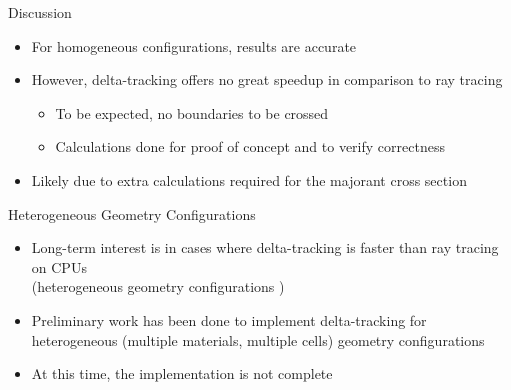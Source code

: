 \documentclass[xcolor=x11names, compress]{beamer}
\renewcommand{\(}{\begin{columns}}
\renewcommand{\)}{\end{columns}}
\newcommand{\<}[1]{\begin{column}{#1}}
\renewcommand{\>}{\end{column}}
\begin{document}
\begin{frame}{Discussion}
	\begin{itemize}
	\item{For homogeneous configurations, results are accurate}
	\pause
	\vspace*{1 em}
	\item{However, delta-tracking offers no great speedup in comparison to ray tracing}
		\begin{itemize}
		\pause
		\item{To be expected, no boundaries to be crossed}
		\item{Calculations done for proof of concept and to verify correctness}
		\end{itemize}
	\pause
	\vspace*{1 em}
	\item{Likely due to extra calculations required for the majorant cross section}
	\end{itemize}
\end{frame}


\begin{frame}{Heterogeneous Geometry Configurations}
	\begin{itemize}
	\item{Long-term interest is in cases where delta-tracking is faster than ray tracing on CPUs\\ (heterogeneous geometry configurations \cite{serpent})}
	\pause
	\vspace*{1 em}
	\item{Preliminary work has been done to implement delta-tracking for heterogeneous (multiple 
	materials, multiple cells) geometry configurations}
	\pause
	\vspace*{1 em}
	\item{At this time, the implementation is not complete}
	\end{itemize}
\end{frame}


\end{document}
